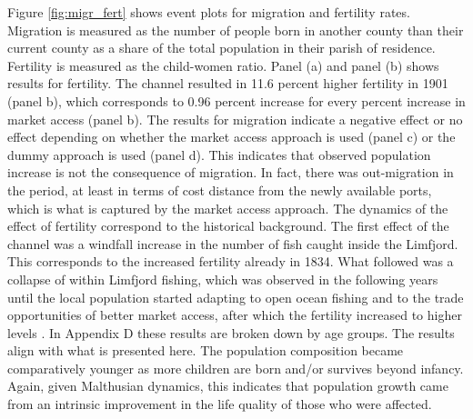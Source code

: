 \documentclass[11pt]{article}
\begin{document}
Figure \ref{fig:migr_fert} shows event plots for migration and fertility rates. Migration is measured as the number of people born in another county than their current county as a share of the total population in their parish of residence. Fertility is measured as the child-women ratio. Panel (a) and panel (b) shows results for fertility. The channel resulted in 11.6 percent higher fertility in 1901 (panel b), which corresponds to 0.96 percent increase for every percent increase in market access (panel b). The results for migration indicate a negative effect or no effect depending on whether the market access approach is used (panel c) or the dummy approach is used (panel d). This indicates that observed population increase is not the consequence of migration. In fact, there was out-migration in the period, at least in terms of cost distance from the newly available ports, which is what is captured by the market access approach. The dynamics of the effect of fertility correspond to the historical background. The first effect of the channel was a windfall increase in the number of fish caught inside the Limfjord. This corresponds to the increased fertility already in 1834. What followed was a collapse of within Limfjord fishing, which was observed in the following years until the local population started adapting to open ocean fishing and to the trade opportunities of better market access, after which the fertility increased to higher levels \citep{Poulsen2007, Poulsen2022}. In Appendix D these results are broken down by age groups. The results align with what is presented here. The population composition became comparatively younger as more children are born and/or survives beyond infancy. Again, given Malthusian dynamics, this indicates that population growth came from an intrinsic improvement in the life quality of those who were affected. 
\end{document}
